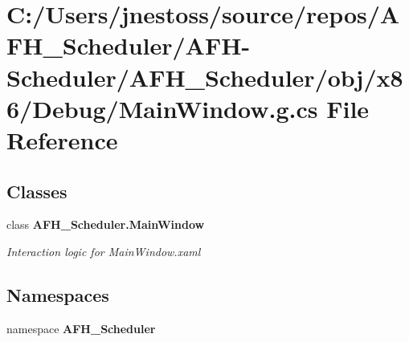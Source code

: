 \section{C\+:/\+Users/jnestoss/source/repos/\+A\+F\+H\+\_\+\+Scheduler/\+A\+F\+H-\/\+Scheduler/\+A\+F\+H\+\_\+\+Scheduler/obj/x86/\+Debug/\+Main\+Window.g.\+cs File Reference}
\label{x86_2_debug_2_main_window_8g_8cs}
\subsection*{Classes}
\begin{DoxyCompactItemize}
\item 
class \textbf{ A\+F\+H\+\_\+\+Scheduler.\+Main\+Window}
\begin{DoxyCompactList}\small\item\em Interaction logic for Main\+Window.\+xaml \end{DoxyCompactList}\end{DoxyCompactItemize}
\subsection*{Namespaces}
\begin{DoxyCompactItemize}
\item 
namespace \textbf{ A\+F\+H\+\_\+\+Scheduler}
\end{DoxyCompactItemize}
